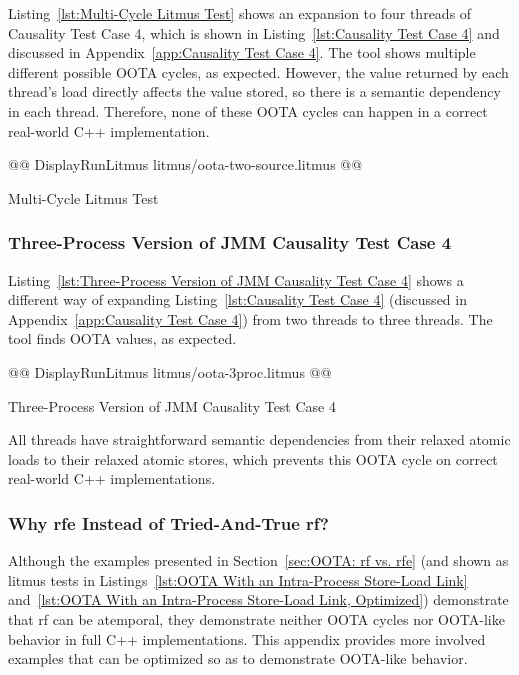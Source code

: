\documentclass[10]{article}
\begin{document}
Listing~\ref{lst:Multi-Cycle Litmus Test}
shows an expansion to four threads of Causality Test Case 4, which is shown in
Listing~\ref{lst:Causality Test Case 4}
and discussed in
Appendix~\ref{app:Causality Test Case 4}.
The  tool shows multiple different possible OOTA cycles,
as expected.
However, the value returned by each thread's load directly affects the
value stored, so there is a semantic dependency in each thread.
Therefore, none of these OOTA cycles can happen in a correct real-world
C++ implementation.

\begin{listing}[tbp]
@@ DisplayRunLitmus litmus/oota-two-source.litmus @@
\caption{Multi-Cycle Litmus Test}
\label{lst:Multi-Cycle Litmus Test}
\end{listing}

\subsubsection{Three-Process Version of JMM Causality Test Case 4}
\label{app:Three-Process Version of JMM Causality Test Case 4}

Listing~\ref{lst:Three-Process Version of JMM Causality Test Case 4}
shows a different way of expanding
Listing~\ref{lst:Causality Test Case 4}
(discussed in
Appendix~\ref{app:Causality Test Case 4})
from two threads to three threads.
The  tool finds OOTA values, as expected.

\begin{listing}[tbp]
@@ DisplayRunLitmus litmus/oota-3proc.litmus @@
\caption{Three-Process Version of JMM Causality Test Case 4}
\label{lst:Three-Process Version of JMM Causality Test Case 4}
\end{listing}

All threads have straightforward semantic dependencies from their
relaxed atomic loads to their relaxed atomic stores, which prevents this
OOTA cycle on correct real-world C++ implementations.

\subsubsection{Why rfe Instead of Tried-And-True rf?}
\label{app:Why rfe Instead of Tried-And-True rf?}

Although the examples presented in
Section~\ref{sec:OOTA: rf vs. rfe}
(and shown as litmus tests in
Listings~\ref{lst:OOTA With an Intra-Process Store-Load Link}
and~\ref{lst:OOTA With an Intra-Process Store-Load Link, Optimized})
demonstrate that rf can be atemporal, they demonstrate neither
OOTA cycles nor OOTA-like behavior in full C++ implementations.
This appendix provides more involved examples that can be optimized
so as to demonstrate OOTA-like behavior.
\end{document}
